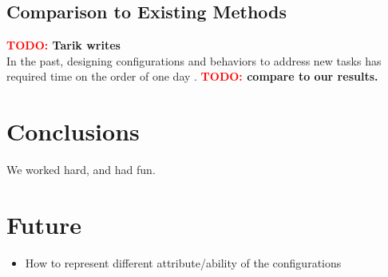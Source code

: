 \documentclass[conference]{IEEEtran}
\theoremstyle{definition}
\newcommand{\TODO}[1]{ {\bf \textcolor{red}{TODO:} #1 }}
\begin{document}
\subsection{Comparison to Existing Methods}
\TODO{Tarik writes}\\
In the past, designing configurations and behaviors to address new tasks has required
time on the order of one day \cite{sastra2011using}. \TODO{compare to our results.}

\section{Conclusions}
We worked hard, and had fun.

\section{Future}
\begin{itemize}
\item How to represent different attribute/ability of the configurations
\end{itemize}







\end{document}
